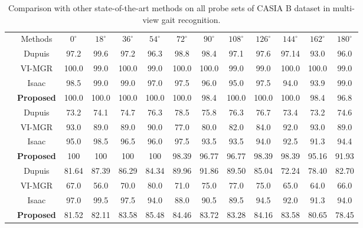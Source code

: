 \begin{table}
	\centering
	\caption [Comparison with other state-of-the-art methods on all probe sets of CASIA B dataset in multi-view gait recognition]
	{Comparison with other state-of-the-art methods on all probe sets of CASIA B dataset in multi-view gait recognition. \label{table:comp_multi_view}}
	\setlength{\tabcolsep}{3.5pt}
	\small
	{\begin{tabular*}{\textwidth}{|c|c|cccc cccc ccc|} \cline{1-13}\rule{0pt}{3ex}
		&Methods &${0^{\circ}}$ &${18^{\circ}}$  &${36^{\circ}}$ &${54^{\circ}}$ &${72^{\circ}}$	&${90^{\circ}}$	&${108^{\circ}}$ &${126^{\circ}}$ &${144^{\circ}}$ &${162^{\circ}}$  &${180^{\circ}}$ \\\cline{1-13}\rule{0pt}{3ex}
					
		\multirow{4}{*}{\rotatebox{90}{Normal}} &Dupuis &97.2 &99.6 &97.2 &96.3 &98.8 &98.4 &97.1 &97.6 &97.14 &93.0 &96.0 \\\rule{0pt}{3ex}
		
		&VI-MGR &100.0 &99.0 &100.0 &99.0 &100.0 &100.0 &99.0 &99.0 &100.0 &100.0 &99.0 \\ \rule{0pt}{3ex}
		
		&Isaac &98.5 &99.0 &99.0 &97.0 &97.5 &96.0 &95.0 &97.5 &94.0 &93.9 &99.0 \\\rule{0pt}{3ex}
		
		&\textbf{Proposed} &100.0  &100.0  &100.0  &100.0  &100.0  &98.4  &100.0  &100.0  &100.0  &98.4  &96.8 \\\cline{1-13}\rule{0pt}{3ex}
	
	
	
		\multirow{4}{*}{\rotatebox{90}{Bag}} &Dupuis &73.2 &74.1 &74.7 &76.3 &78.5 &75.8 &76.3 &76.7 &73.4 &73.2 &74.6 \\\rule{0pt}{3ex} 

		&VI-MGR &93.0 &89.0 &89.0 &90.0 &77.0 &80.0 &82.0 &84.0 &92.0 &93.0 &89.0 \\\rule{0pt}{3ex}

		&Isaac &95.0 &98.5 &96.5 &96.0 &97.5 &93.5 &93.5 &94.0 &92.5 &91.3 &94.4 \\\rule{0pt}{3ex}

		&\textbf{Proposed}  &100 &100 &100 &100 &98.39 &96.77 &96.77 &98.39 &98.39 &95.16 &91.93 \\\hline\rule{0pt}{3ex}


		\multirow{4}{*}{\rotatebox{90}{Coat}} &Dupuis &81.64 &87.39 &86.29 &84.34 &89.96 &91.86 &89.50 &85.04 &72.24 &78.40 &82.70\\\rule{0pt}{3ex}
		
		&VI-MGR &67.0 &56.0 &70.0 &80.0 &71.0 &75.0 &77.0 &75.0 &65.0 &64.0 &66.0 \\\rule{0pt}{3ex}
		
		&Isaac &97.0 &99.5 &97.5 &94.0 &88.0 &90.5 &89.5 &94.5 &92.0 &91.3 &94.0 \\\rule{0pt}{3ex}
		
		&\textbf{Proposed} &81.52 &82.11 &83.58 &85.48 &84.46 &83.72 &83.28 &84.16 &83.58 &80.65 &78.45 \\\cline{1-13}
\end{tabular*}}{} 
\end{table}

